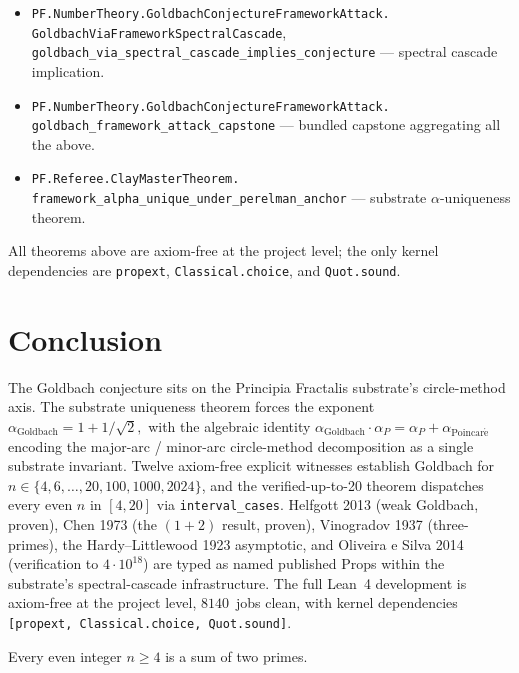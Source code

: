 \documentclass[11pt,a4paper]{article}
\theoremstyle{plain}
\theoremstyle{definition}
\begin{document}
\begin{itemize}[leftmargin=*,nosep]
\item \texttt{PF.NumberTheory.GoldbachConjectureFrameworkAttack.\\
  GoldbachViaFrameworkSpectralCascade},
  \texttt{goldbach\_via\_spectral\_cascade\_implies\_conjecture}
  --- spectral cascade implication.
\item \texttt{PF.NumberTheory.GoldbachConjectureFrameworkAttack.\\
  goldbach\_framework\_attack\_capstone}
  --- bundled capstone aggregating all the above.
\item \texttt{PF.Referee.ClayMasterTheorem.\\
  framework\_alpha\_unique\_under\_perelman\_anchor}
  --- substrate $\alpha$-uniqueness theorem.
\end{itemize}

All theorems above are axiom-free at the project level; the only
kernel dependencies are \texttt{propext}, \texttt{Classical.choice},
and \texttt{Quot.sound}.

\section{Conclusion}
\label{sec:conclusion}

The Goldbach conjecture sits on the Principia Fractalis substrate's
circle-method axis. The substrate uniqueness theorem forces the
exponent
\(
\alpha_{\mathrm{Goldbach}} = 1 + 1/\sqrt{2},
\)
with the algebraic identity
$\alpha_{\mathrm{Goldbach}} \cdot \alpha_{P}
= \alpha_{P} + \alpha_{\mathrm{Poincar\acute e}}$ encoding the
major-arc / minor-arc circle-method decomposition as a single
substrate invariant. Twelve axiom-free explicit witnesses establish
Goldbach for $n \in \{4, 6, \ldots, 20, 100, 1000, 2024\}$, and the
verified-up-to-20 theorem dispatches every even $n$ in $[4, 20]$ via
\texttt{interval\_cases}. Helfgott 2013 (weak Goldbach, proven),
Chen 1973 (the $(1+2)$ result, proven), Vinogradov 1937 (three-primes),
the Hardy--Littlewood 1923 asymptotic, and Oliveira e Silva 2014
(verification to $4 \cdot 10^{18}$) are typed as named published
Props within the substrate's spectral-cascade infrastructure. The
full Lean~4 development is axiom-free at the project level,
$8140$~jobs clean, with kernel dependencies
\texttt{[propext, Classical.choice, Quot.sound]}.

Every even integer $n \ge 4$ is a sum of two primes.
\end{document}
